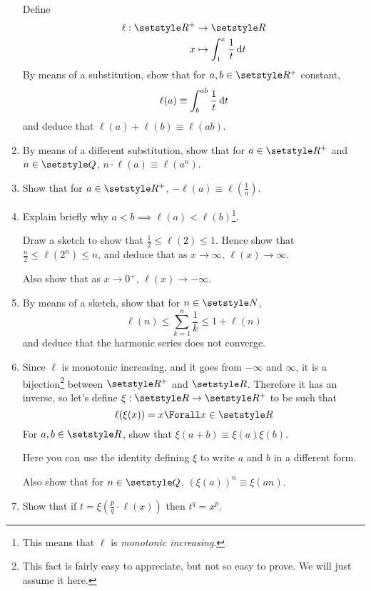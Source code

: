 \begin{enumerate}
  Define
  \begin{align*}
   \ell : \Reals^+ &\to \Reals\\
   x &\mapsto \integ[1]<x>{\frac 1t}{t}
  \end{align*}
  By means of a substitution, show that for \(a, b \in \Reals^+\) constant,
  \begin{equation*}
   \ell(a) \equiv \integ[b]<ab>{\frac 1t}{t}
  \end{equation*}
  and deduce that \(\ell(a) + \ell(b) \equiv \ell(ab)\).
 \item
  By means of a different substitution, show that for \(a \in \Reals^+\) and
  \(n \in \Rationals\), \(n \cdot \ell(a) \equiv \ell(a^n)\).
 \item
  Show that for \(a \in \Reals^+\), \(-\ell(a) \equiv \ell(\frac 1a)\).
 \item
  Explain briefly why \(a < b \implies \ell(a) < \ell(b)\)\footnote{
   This means that \(\ell\) is \emph{monotonic increasing}.
  }.

  Draw a sketch to show that \(\frac 12 \le \ell(2) \le 1\). Hence show that
  \(\frac n2 \le \ell(2^n) \le n\), and deduce that as \(x \to \infty\),
  \(\ell(x) \to \infty\).

  Also show that as \(x \to 0^+\), \(\ell(x) \to -\infty\).
 \item
  By means of a sketch, show that for \(n \in \Naturals\),
  \begin{equation*}
   \ell(n) \le \sum_{k = 1}^n \frac 1k \le 1 + \ell(n)
  \end{equation*}
  and deduce that the harmonic series does not converge.
 \item
  Since \(\ell\) is monotonic increasing, and it goes from \(-\infty\) and
  \(\infty\), it is a bijection\footnote{
   This fact is fairly easy to appreciate, but not so easy to prove. We will
   just assume it here.
  } between \(\Reals^+\) and \(\Reals\). Therefore
  it has an inverse, so let's define \(\xi: \Reals \to \Reals^+\) to be such
  that
  \begin{equation*}
   \ell(\xi(x)) = x \Forall x \in \Reals
  \end{equation*}
  For \(a, b \in \Reals\), show that \(\xi(a + b) \equiv \xi(a) \xi(b)\).

  Here you can use the identity defining \(\xi\) to write \(a\) and \(b\) in a
  different form.

  Also show that for \(n \in \Rationals\), \((\xi(a))^n \equiv \xi(an)\).
 \item
  Show that if \(t = \xi(\frac pq \cdot \ell(x))\) then \(t^q = x^p\).


\end{enumerate}
